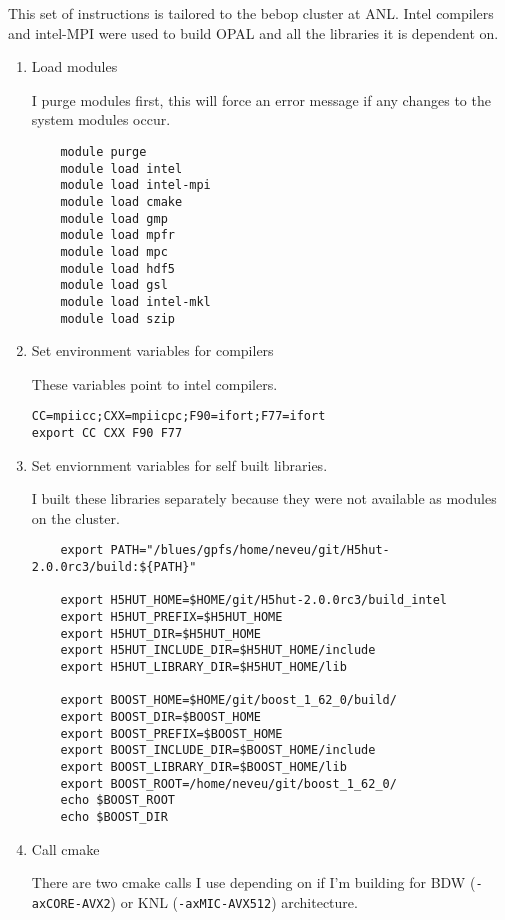 \documentclass{iitthesis}
\begin{document}
\clearpage


%
%
\appendix

 \label{build}
This set of instructions is tailored to the bebop cluster at ANL. 
Intel compilers and intel-MPI were used to build OPAL and all 
the libraries it is dependent on.
\begin{enumerate}[label=Step \arabic*:]
	\item Load modules 

I purge modules first, this will force an error message if any changes
to the system modules occur.
\begin{lstlisting}
	module purge
	module load intel
	module load intel-mpi 
	module load cmake 
	module load gmp   
	module load mpfr  
	module load mpc   
	module load hdf5   
	module load gsl   
	module load intel-mkl
	module load szip
\end{lstlisting}

    \item Set environment variables for compilers 
 
These variables point to intel compilers. 
\begin{lstlisting}
CC=mpiicc;CXX=mpiicpc;F90=ifort;F77=ifort
export CC CXX F90 F77
\end{lstlisting}

    \item Set enviornment variables for self built libraries.
    
I built these libraries separately because they were not available as 
modules on the cluster. 

\begin{lstlisting}
	export PATH="/blues/gpfs/home/neveu/git/H5hut-2.0.0rc3/build:${PATH}"
	
	export H5HUT_HOME=$HOME/git/H5hut-2.0.0rc3/build_intel
	export H5HUT_PREFIX=$H5HUT_HOME
	export H5HUT_DIR=$H5HUT_HOME
	export H5HUT_INCLUDE_DIR=$H5HUT_HOME/include
	export H5HUT_LIBRARY_DIR=$H5HUT_HOME/lib
	
	export BOOST_HOME=$HOME/git/boost_1_62_0/build/
	export BOOST_DIR=$BOOST_HOME
	export BOOST_PREFIX=$BOOST_HOME
	export BOOST_INCLUDE_DIR=$BOOST_HOME/include
	export BOOST_LIBRARY_DIR=$BOOST_HOME/lib
	export BOOST_ROOT=/home/neveu/git/boost_1_62_0/
	echo $BOOST_ROOT
	echo $BOOST_DIR
\end{lstlisting}

    \item Call cmake 
    
There are two cmake calls I use depending on if I'm building for 
BDW (\verb|-axCORE-AVX2|) or KNL (\verb|-axMIC-AVX512|) architecture. 
    

\end{enumerate}
\end{document}
